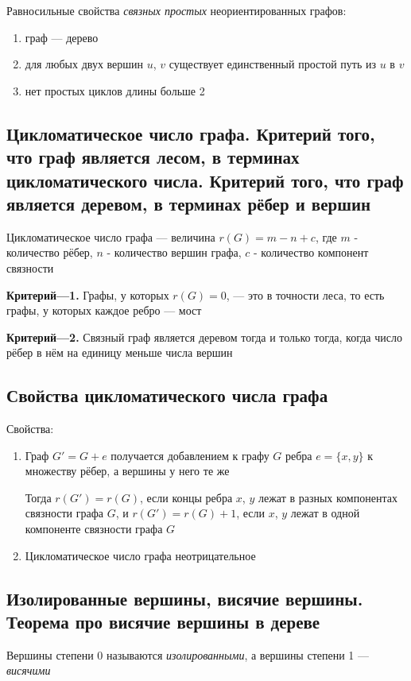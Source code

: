 \documentclass[a4paper]{article}
\begin{document}
Равносильные свойства \textit{связных простых} неориентированных графов:
\begin{enumerate}
    \item граф — дерево
    \item для любых двух вершин $u$, $v$ существует единственный простой путь из $u$ в $v$
    \item нет простых циклов длины больше 2
\end{enumerate}


\subsection{Цикломатическое число графа. Критерий того, что граф является лесом, в терминах цикломатического числа. Критерий того, что граф является деревом, в терминах рёбер и вершин}
 Цикломатическое число графа — величина $r(G)=m-n+c$, где $m$ - количество рёбер, $n$ - количество вершин графа, $c$ - количество компонент связности 

\textbf{Критерий—1.} Графы, у которых $r(G)=0$, — это в точности леса, то есть графы, у которых каждое ребро — мост

\textbf{Критерий—2.} Связный граф является деревом тогда и только тогда, когда число рёбер в нём на единицу меньше числа вершин

\subsection{Свойства цикломатического числа графа}
Свойства:
\begin{enumerate}
    \item Граф $G'=G+e$ получается добавлением к графу $G$ ребра $e=\{x,y\}$ к множеству рёбер, а вершины у него те же
    
    Тогда $r(G')=r(G)$, если концы ребра $x$, $y$ лежат в разных компонентах связности графа $G$, и $r(G')=r(G)+1$, если $x$, $y$ лежат в одной компоненте связности графа $G$

    \item Цикломатическое число графа неотрицательное
\end{enumerate}


\subsection{Изолированные вершины, висячие вершины. Теорема про висячие вершины в дереве}
 Вершины степени 0 называются \textit{изолированными}, а вершины степени 1 — \textit{висячими}
\end{document}
